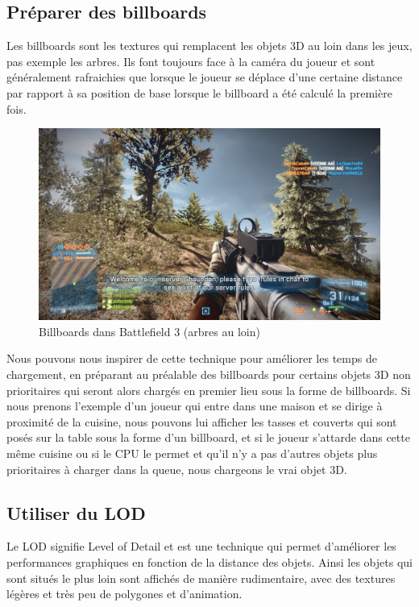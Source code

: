 \documentclass[a4paper, 11pt]{article} %
\begin{document}
\newpage
\subsection{Préparer des billboards}
Les billboards sont les textures qui remplacent les objets 3D au loin dans les jeux, pas exemple les arbres. Ils font toujours face à la caméra du joueur et sont généralement rafraichies que lorsque le joueur se déplace d'une certaine distance par rapport à sa position de base lorsque le billboard a été calculé la première fois. 

\begin{figure}[!h]%
\includegraphics[width=\columnwidth]{images/bf3_billboards.png}%
\caption{Billboards dans Battlefield 3 (arbres au loin)}%
\label{}%
\end{figure}

Nous pouvons nous inspirer de cette technique pour améliorer les temps de chargement, en préparant au préalable des billboards pour certains objets 3D non prioritaires qui seront alors chargés en premier lieu sous la forme de billboards. Si nous prenons l'exemple d'un joueur qui entre dans une maison et se dirige à proximité de la cuisine, nous pouvons lui afficher les tasses et couverts qui sont posés sur la table sous la forme d'un billboard, et si le joueur s'attarde dans cette même cuisine ou si le CPU le permet et qu'il n'y a pas d'autres objets plus prioritaires à charger dans la queue, nous chargeons le vrai objet 3D.


\newpage
\subsection{Utiliser du LOD}
Le LOD signifie Level of Detail et est une technique qui permet d'améliorer les performances graphiques en fonction de la distance des objets. Ainsi les objets qui sont situés le plus loin sont affichés de manière rudimentaire, avec des textures légères et très peu de polygones et d'animation.
\end{document}
